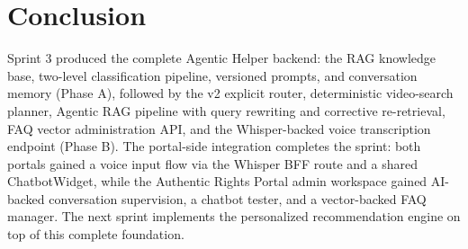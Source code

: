 \section*{Conclusion}

Sprint 3 produced the complete Agentic Helper backend: the RAG knowledge base, two-level
classification pipeline, versioned prompts, and conversation memory (Phase A), followed by the
v2 explicit router, deterministic video-search planner, Agentic RAG pipeline with query rewriting
and corrective re-retrieval, FAQ vector administration API, and the Whisper-backed voice
transcription endpoint (Phase B). The portal-side integration completes the sprint: both portals
gained a voice input flow via the Whisper BFF route and a shared ChatbotWidget, while the
Authentic Rights Portal admin workspace gained AI-backed conversation supervision, a chatbot
tester, and a vector-backed FAQ manager. The next sprint implements the personalized
recommendation engine on top of this complete foundation.
